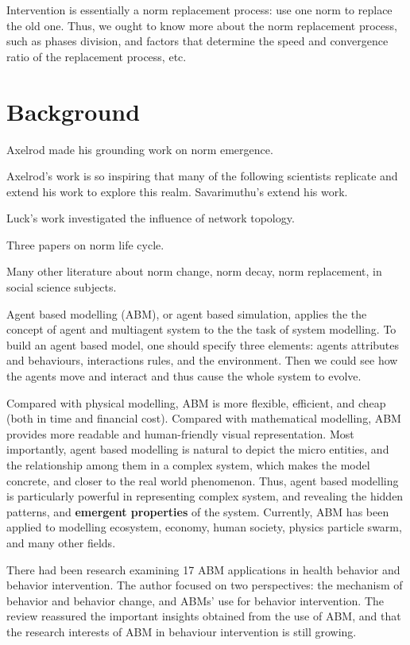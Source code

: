 \documentclass[12pt]{extarticle}
\begin{document}
Intervention is essentially a norm replacement process: use one norm to replace the old one. Thus, we ought to know more about the norm replacement process, such as phases division, and factors that determine the speed and convergence ratio of the replacement process, etc.


\section{Background}
Axelrod made his grounding work on norm emergence.

Axelrod's work is so inspiring that many of the following scientists replicate and extend his work to explore this realm. Savarimuthu's extend his work.

Luck's work investigated the influence of network topology.

Three papers on norm life cycle.

Many other literature about norm change, norm decay, norm replacement, in social science subjects.

Agent based modelling (ABM), or agent based simulation, applies the the concept of agent and multiagent system to the the task of system modelling. To build an agent based model, one should specify three elements: agents attributes and behaviours, interactions rules, and the environment. Then we could see how the agents move and interact and thus cause the whole system to evolve.

Compared with physical modelling, ABM is more flexible, efficient, and cheap (both in time and financial cost). Compared with mathematical modelling, ABM provides more readable and human-friendly visual representation. Most importantly, agent based modelling is natural to depict the micro entities, and the relationship among them in a  complex system, which makes the model concrete, and closer to the real world phenomenon. Thus, agent based modelling is particularly powerful in representing complex system, and revealing the hidden patterns, and \textbf{emergent properties} of the system. Currently, ABM has been applied to modelling ecosystem, economy, human society, physics particle swarm, and many other fields.

There had been research\cite{Yang2019} examining 17 ABM applications in health behavior and behavior intervention. The author focused on two perspectives: the mechanism of behavior and behavior change, and ABMs' use for behavior intervention. The review reassured the important insights obtained from the use of ABM, and that the research interests of ABM in behaviour intervention is still growing.
\end{document}
